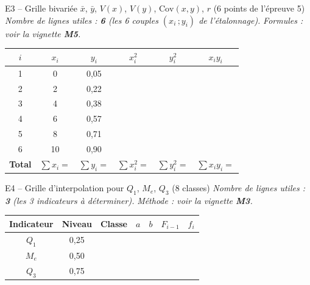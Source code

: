 \documentclass[11pt,a4paper]{article}
\begin{document}
\begin{vignetteMethode}{E3 -- Grille bivariée $\bar{x}$, $\bar{y}$, $V(x)$, $V(y)$, $\mathrm{Cov}(x,y)$, $r$ (6 points de l'épreuve 5)}
\emph{Nombre de lignes utiles : \textbf{6} (les 6 couples $(x_i\,;y_i)$ de l'étalonnage).}
\emph{Formules : voir la vignette \textbf{M5}.}

\vspace{0.2cm}
\renewcommand{\arraystretch}{1.5}
\begin{center}
\small
\begin{tabular}{|c|c|c|c|c|c|}
\hline
$i$ & $x_i$ & $y_i$ & $x_i^2$ & $y_i^2$ & $x_i y_i$ \\
\hline
1 & 0 & 0{,}05 & & & \\ \hline
2 & 2 & 0{,}22 & & & \\ \hline
3 & 4 & 0{,}38 & & & \\ \hline
4 & 6 & 0{,}57 & & & \\ \hline
5 & 8 & 0{,}71 & & & \\ \hline
6 & 10 & 0{,}90 & & & \\ \hline
\multicolumn{1}{|r|}{\textbf{Total}} & $\sum x_i =$ & $\sum y_i =$ & $\sum x_i^2 =$ & $\sum y_i^2 =$ & $\sum x_i y_i =$ \\ \hline
\end{tabular}
\end{center}
\end{vignetteMethode}

\begin{vignetteMethode}{E4 -- Grille d'interpolation pour $Q_1$, $M_e$, $Q_3$ (8 classes)}
\emph{Nombre de lignes utiles : \textbf{3} (les 3 indicateurs à déterminer).}
\emph{Méthode : voir la vignette \textbf{M3}.}

\vspace{0.2cm}
\renewcommand{\arraystretch}{1.7}
\begin{center}
\small
\begin{tabular}{|c|c|c|c|c|c|c|}
\hline
\textbf{Indicateur} & \textbf{Niveau} & \textbf{Classe} & $a$ & $b$ & $F_{i-1}$ & $f_i$ \\
\hline
$Q_1$ & 0{,}25 & & & & & \\[0.15cm] \hline
$M_e$ & 0{,}50 & & & & & \\[0.15cm] \hline
$Q_3$ & 0{,}75 & & & & & \\[0.15cm] \hline
\end{tabular}
\end{center}
\end{vignetteMethode}
\end{document}

